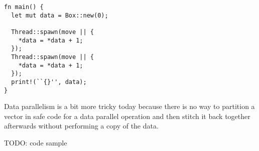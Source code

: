 \begin{lstlisting}
fn main() {
  let mut data = Box::new(0);

  Thread::spawn(move || {
    *data = *data + 1;
  });
  Thread::spawn(move || {
    *data = *data + 1;
  });
  print!(``{}'', data);
}
\end{lstlisting}


Data parallelism is a bit more tricky today because there is no way to \eg{} partition a vector in safe code
for a data parallel operation and then stitch it back together afterwards without performing a copy of the data.

TODO: code sample


